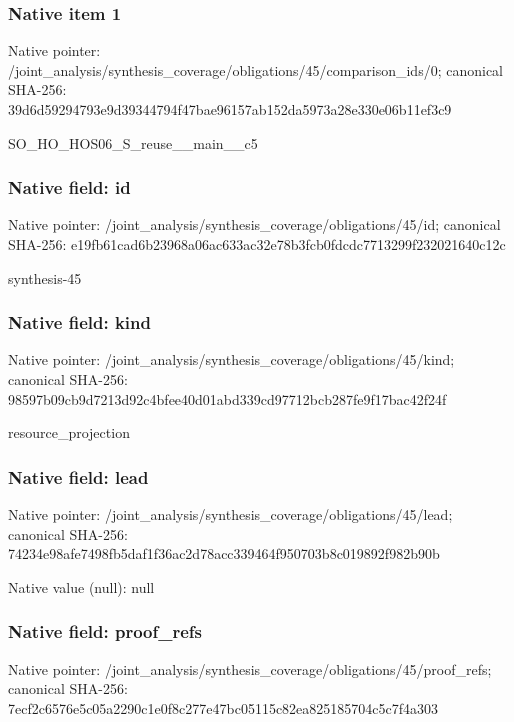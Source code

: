 \documentclass[10pt,a4paper]{article}
\begin{document}
\subsubsection{Native item 1}
Native pointer: /joint\_\allowbreak{}analysis/synthesis\_\allowbreak{}coverage/obligations/45/comparison\_\allowbreak{}ids/0; canonical SHA-256: 39d6d59294793e9d39344794f47bae96157ab152da5973a28e330e06b11ef3c9

\begingroup\raggedright\sloppy SO\_\allowbreak{}HO\_\allowbreak{}HOS06\_\allowbreak{}S\_\allowbreak{}reuse\_\allowbreak{}\_\allowbreak{}main\_\allowbreak{}\_\allowbreak{}c5\par\endgroup

\subsubsection{Native field: id}
Native pointer: /joint\_\allowbreak{}analysis/synthesis\_\allowbreak{}coverage/obligations/45/id; canonical SHA-256: e19fb61cad6b23968a06ac633ac32e78b3fcb0fdcdc7713299f232021640c12c

\begingroup\raggedright\sloppy synthesis-45\par\endgroup

\subsubsection{Native field: kind}
Native pointer: /joint\_\allowbreak{}analysis/synthesis\_\allowbreak{}coverage/obligations/45/kind; canonical SHA-256: 98597b09cb9d7213d92c4bfee40d01abd339cd97712bcb287fe9f17bac42f24f

\begingroup\raggedright\sloppy resource\_\allowbreak{}projection\par\endgroup

\subsubsection{Native field: lead}
Native pointer: /joint\_\allowbreak{}analysis/synthesis\_\allowbreak{}coverage/obligations/45/lead; canonical SHA-256: 74234e98afe7498fb5daf1f36ac2d78acc339464f950703b8c019892f982b90b

Native value (null): null

\subsubsection{Native field: proof\_\allowbreak{}refs}
Native pointer: /joint\_\allowbreak{}analysis/synthesis\_\allowbreak{}coverage/obligations/45/proof\_\allowbreak{}refs; canonical SHA-256: 7ecf2c6576e5c05a2290c1e0f8c277e47bc05115c82ea825185704c5c7f4a303
\end{document}
